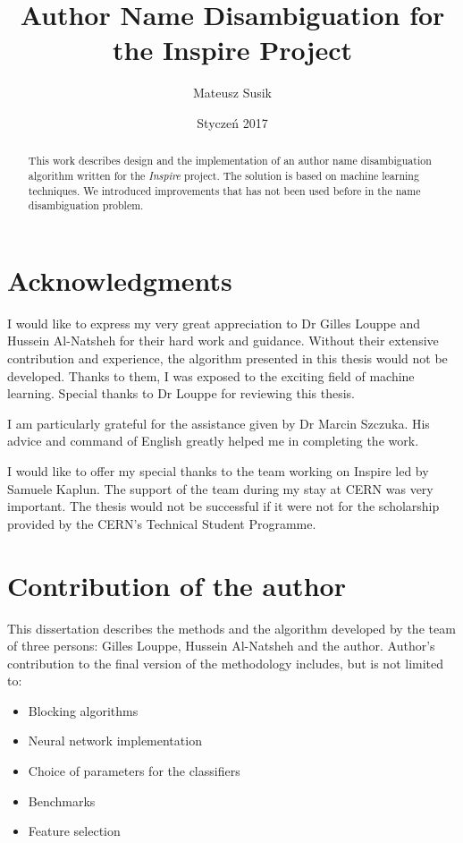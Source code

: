 \documentclass{pracamgr}
\author{Mateusz Susik}
\title{Author Name Disambiguation for the Inspire Project}
\date{Styczeń 2017}
\begin{document}
\maketitle


\begin{abstract}
  This work describes design and the implementation of an author name disambiguation
  algorithm written for the \textit{Inspire} project. The solution is based on machine
  learning techniques. We introduced improvements that has not been used before in the
  name disambiguation problem.
\end{abstract}


\chapter*{Acknowledgments}

I would like to express my very great appreciation to Dr Gilles Louppe and Hussein Al-Natsheh
for their hard work and guidance. Without their extensive contribution and experience,
the algorithm presented in this thesis would not be developed. Thanks to them, I was
exposed to the exciting field of machine learning. Special thanks to Dr Louppe for
reviewing this thesis.

I am particularly grateful for the assistance given by Dr Marcin Szczuka. His advice
and command of English greatly helped me in completing the work.

I would like to offer my special thanks to the team working on Inspire led by
Samuele Kaplun. The support of the team during my stay at CERN was very important.
The thesis would not be successful if it were not for the scholarship provided by
the CERN's Technical Student Programme.


\chapter*{Contribution of the author}

This dissertation describes the methods and the algorithm developed by the team of three persons:
Gilles Louppe, Hussein Al-Natsheh and the author. Author's contribution to the final
version of the methodology includes, but is not limited to:

\begin{itemize}
\item Blocking algorithms
\item Neural network implementation
\item Choice of parameters for the classifiers
\item Benchmarks
\item Feature selection
\end{itemize}
\end{document}

